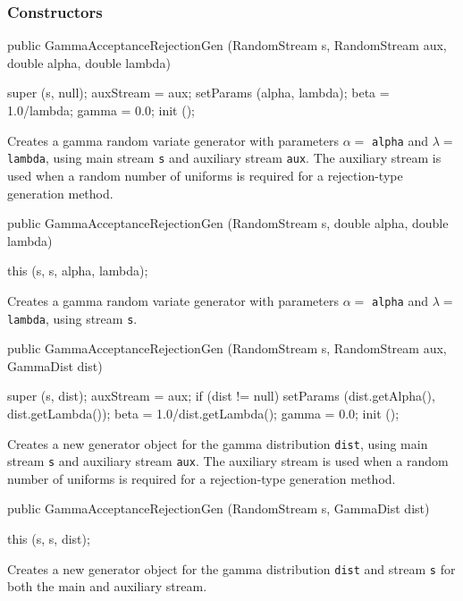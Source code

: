 \subsubsection* {Constructors}
\begin{code}

   public GammaAcceptanceRejectionGen (RandomStream s, RandomStream aux,
                                       double alpha, double lambda) \begin{hide} {
      super (s, null);
      auxStream = aux;
      setParams (alpha, lambda);
      beta  = 1.0/lambda;
      gamma = 0.0;
      init ();
   }\end{hide}
\end{code} 
\begin{tabb} Creates a gamma random variate generator with parameters $\alpha =$ 
 \texttt{alpha} and $\lambda =$ \texttt{lambda}, using main stream \texttt{s} and 
  auxiliary stream \texttt{aux}.
 The auxiliary stream is used when a random number of uniforms
 is required for a rejection-type generation method.
\end{tabb}
\begin{code}

   public GammaAcceptanceRejectionGen (RandomStream s,
                                       double alpha, double lambda) \begin{hide} {
      this (s, s, alpha, lambda);
   }\end{hide}
\end{code} 
\begin{tabb} Creates a gamma random variate generator with parameters $\alpha =$ 
 \texttt{alpha} and $\lambda =$ \texttt{lambda}, using stream \texttt{s}.
\end{tabb}
\begin{code}

   public GammaAcceptanceRejectionGen (RandomStream s, RandomStream aux, 
                                       GammaDist dist) \begin{hide} {
      super (s, dist);
      auxStream = aux;
      if (dist != null)
         setParams (dist.getAlpha(), dist.getLambda());
      beta  = 1.0/dist.getLambda();
      gamma = 0.0;
      init ();
   }\end{hide}
\end{code}
  \begin{tabb}  Creates a new generator object for the gamma 
    distribution \texttt{dist}, using main stream \texttt{s} and 
    auxiliary stream \texttt{aux}. 
    The auxiliary stream is used when a random number of uniforms
    is required for a rejection-type generation method.
  \end{tabb}
\begin{code}

   public GammaAcceptanceRejectionGen (RandomStream s, GammaDist dist) \begin{hide} {
      this (s, s, dist);
   }\end{hide}
\end{code}
  \begin{tabb}  Creates a new generator object for the gamma
    distribution \texttt{dist} and  stream \texttt{s} for both the main and
    auxiliary stream.
  \end{tabb}


